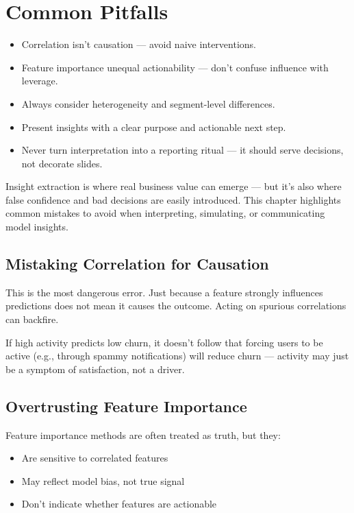 \documentclass[12pt,openany]{book}
\begin{document}
\chapter{Common Pitfalls}

\begin{summarybox}
\begin{itemize}
  \item Correlation isn’t causation — avoid naive interventions.
  \item Feature importance unequal actionability — don’t confuse influence with leverage.
  \item Always consider heterogeneity and segment-level differences.
  \item Present insights with a clear purpose and actionable next step.
  \item Never turn interpretation into a reporting ritual — it should serve decisions, not decorate slides.
\end{itemize}
\end{summarybox}

Insight extraction is where real business value can emerge — but it’s also where false confidence and bad decisions are easily introduced. This chapter highlights common mistakes to avoid when interpreting, simulating, or communicating model insights.



\section{Mistaking Correlation for Causation}

This is the most dangerous error. Just because a feature strongly influences predictions does not mean it causes the outcome. Acting on spurious correlations can backfire.

\begin{examplebox}
If high activity predicts low churn, it doesn’t follow that forcing users to be active (e.g., through spammy notifications) will reduce churn — activity may just be a symptom of satisfaction, not a driver.
\end{examplebox}



\section{Overtrusting Feature Importance}

Feature importance methods are often treated as truth, but they:
\begin{itemize}
  \item Are sensitive to correlated features
  \item May reflect model bias, not true signal
  \item Don’t indicate whether features are actionable
\end{itemize}
\end{document}
